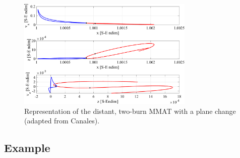 \begin{figure}[ht]
    \centering
    \includegraphics[width=0.75\textwidth]{figures/PhasePlotsIntersect.pdf}
    \caption{Representation of the distant, two-burn MMAT with a plane change (adapted from Canales\cite{Canales:2021b}).}
    \label{fig:phasePlotsIntersect}
\end{figure}

\subsection{Example}
